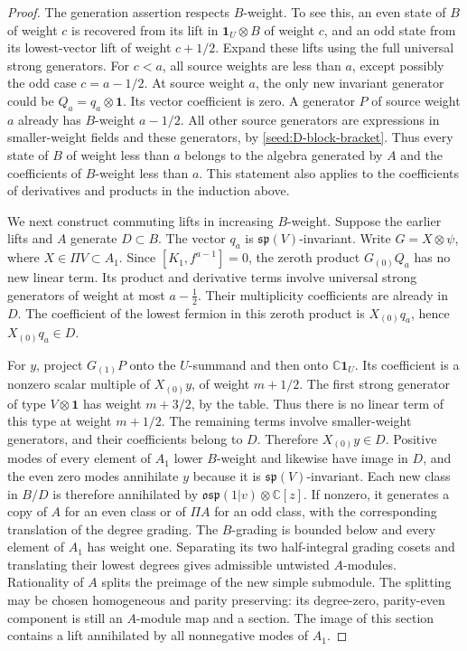\documentclass[11pt,a4paper]{amsart}
\numberwithin{equation}{section}
\theoremstyle{definition}
\theoremstyle{remark}
\newcommand{\C}{\mathbb C}
\begin{document}
\begin{proof}
The generation assertion respects $B$-weight. To see this, an even
state of $B$ of weight $c$ is recovered from its lift in $\mathbf1_U\otimes B$ of weight $c$, and an odd state from its lowest-vector lift of weight
$c+1/2$. Expand these lifts using the full universal strong generators.
For $c<a$, all source weights are less than $a$, except possibly the
odd case $c=a-1/2$. At source weight $a$, the only new invariant generator
could be $Q_a=q_a\otimes\mathbf1$. Its vector coefficient is zero.
A generator $P$ of source weight $a$ already has $B$-weight $a-1/2$.
All other source generators are expressions in smaller-weight fields
and these generators, by \eqref{seed:D-block-bracket}. Thus every state of $B$ of weight less
than $a$ belongs to the algebra generated by $A$ and the coefficients
of $B$-weight less than $a$. This statement also applies to the
coefficients of derivatives and products in the induction above.

We next construct commuting lifts in increasing $B$-weight. Suppose
the earlier lifts and $A$ generate $D\subset B$. The vector $q_a$
is $\mathfrak{sp}(V)$-invariant. Write $G=X\otimes\psi$, where
$X\in\Pi V\subset A_1$. Since $[K_1,f^{a-1}]=0$, the zeroth
product $G_{(0)}Q_a$ has no new linear term. Its product and derivative
terms involve universal strong generators of weight at most
$a-\frac12$. Their multiplicity coefficients are already in $D$.
The coefficient of the lowest fermion in this zeroth product is
$X_{(0)}q_a$, hence $X_{(0)}q_a\in D$.

For $y$, project $G_{(1)}P$ onto the $U$-summand and then onto
$\C\mathbf1_U$. Its coefficient is a nonzero scalar multiple of
$X_{(0)}y$, of weight $m+1/2$. The first strong
generator of type $V\otimes\mathbf1$ has weight $m+3/2$, by the
table. Thus there is no linear term of this type at weight $m+1/2$.
The remaining terms involve smaller-weight generators, and their
coefficients belong to $D$. Therefore $X_{(0)}y\in D$.
Positive modes of every element of $A_1$ lower $B$-weight and likewise
have image in $D$, and the even zero modes annihilate $y$ because
it is $\mathfrak{sp}(V)$-invariant. Each new class in $B/D$ is
therefore annihilated by
$\mathfrak{osp}(1|v)\otimes\C[z]$. If nonzero, it generates a copy
of $A$ for an even class or of $\Pi A$ for an odd class, with the
corresponding translation of the degree grading.
The $B$-grading is bounded below and every element of $A_1$ has
weight one. Separating its two half-integral grading cosets and
translating their lowest degrees gives admissible untwisted
$A$-modules. Rationality of $A$ splits the preimage of the new
simple submodule. The splitting may be chosen homogeneous and
parity preserving: its degree-zero, parity-even component is still
an $A$-module map and a section. The image of this section contains a lift annihilated
by all nonnegative modes of $A_1$.


\end{proof}
\end{document}

